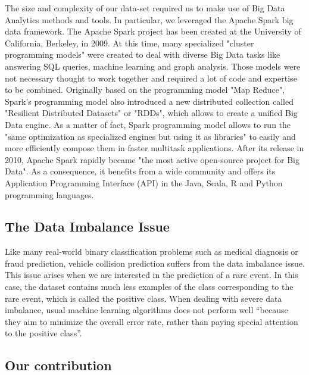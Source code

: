 \documentclass[conference]{IEEEtran}
\begin{document}
The size and complexity of our data-set required us to make use of Big Data Analytics methods and tools. In particular, we leveraged the Apache Spark\cite{spark} big data framework. The Apache Spark project has been created at the University of California, Berkeley, in 2009. At this time, many specialized "cluster programming models" were created to deal with diverse Big Data tasks like answering SQL queries, machine learning and graph analysis\cite{spark}. Those models were not necessary thought to work together and required a lot of code and expertise to be combined. Originally based on the programming model "Map Reduce"\cite{mapreduce}, Spark's programming model also introduced a new distributed collection called "Resilient Distributed Datasets" or "RDDs", which allows to create a unified Big Data engine. As a matter of fact, Spark programming model allows to run the "same optimization as specialized engines but using it as libraries" to easily and more efficiently compose them in faster multitask applications. After its release in 2010, Apache Spark rapidly became "the most active open-source project for Big Data"\cite{spark}. As a consequence, it benefits from a wide community and offers its Application Programming Interface (API) in the Java, Scala, R and Python programming languages. 

\subsection{The Data Imbalance Issue}

Like many real-world binary classification problems such as medical diagnosis or fraud prediction, vehicle collision prediction suffers from the data imbalance issue. This issue arises when we are interested in the prediction of a rare event. In this case, the dataset contains much less examples of the class corresponding to the rare event, which is called the positive class. When dealing with severe data imbalance, usual machine learning algorithms does not perform well ``because they aim to minimize the overall error rate, rather than paying special attention to the positive class''\cite{Chen2004}. 

\subsection{Our contribution}
\end{document}
